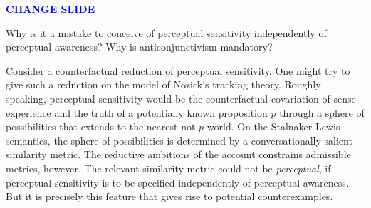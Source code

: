 \documentclass[12pt]{article}
\newcommand{\change}{\textcolor{blue}{\textbf{CHANGE SLIDE}}}
\begin{document}
\change

Why is it a mistake to conceive of perceptual sensitivity independently of perceptual awareness? Why is anticonjunctivism mandatory?

Consider a counterfactual reduction of perceptual sensitivity. One might try to give such a reduction on the model of Nozick's tracking theory. Roughly speaking, perceptual sensitivity would be the counterfactual covariation of sense experience and the truth of a potentially known proposition \( p \) through a sphere of possibilities that extends to the nearest not-\( p \) world. On the Stalnaker-Lewis semantics, the sphere of possibilities is determined by a conversationally salient similarity metric. The reductive ambitions of the account constrains admissible metrics, however. The relevant similarity metric could not be \emph{perceptual}, if perceptual sensitivity is to be specified independently of perceptual awareness. But it is precisely this feature that gives rise to potential counterexamples. %
\end{document}
